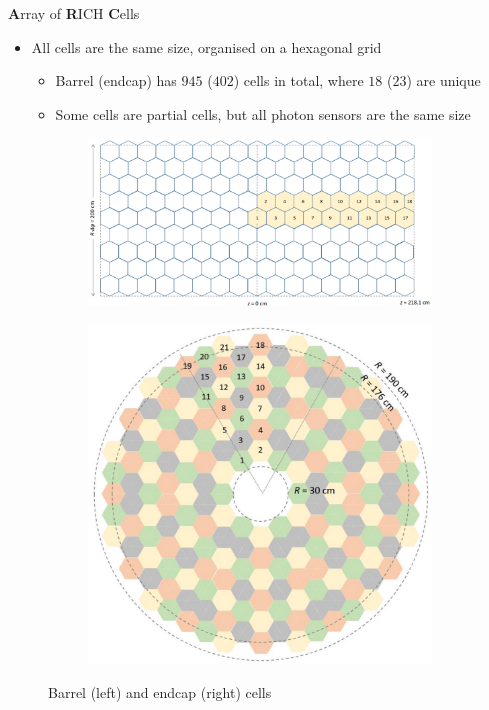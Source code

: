 \documentclass{beamer}
\begin{document}
\begin{frame}{\textbf{A}rray of \textbf{R}ICH \textbf{C}ells}
  \begin{itemize}
    \setlength\itemsep{0.5em}
    \item{All cells are the same size, organised on a hexagonal grid}
    \begin{itemize}
      \item{Barrel (endcap) has $945$ ($402$) cells in total, where $18$ ($23$) are unique}
      \item{Some cells are partial cells, but all photon sensors are the same size}
    \end{itemize}
  \end{itemize}
  \begin{figure}
    \centering
    \begin{subfigure}{0.6\textwidth}
      \includegraphics[width = 1.0\textwidth]{Plots/BarrelCells.png}
    \end{subfigure}%
    \begin{subfigure}{0.3\textwidth}
      \includegraphics[width = 1.0\textwidth]{Plots/EndcapCells.png}
    \end{subfigure}
    \caption{Barrel (left) and endcap (right) cells}
  \end{figure}
\end{frame}
\end{document}
